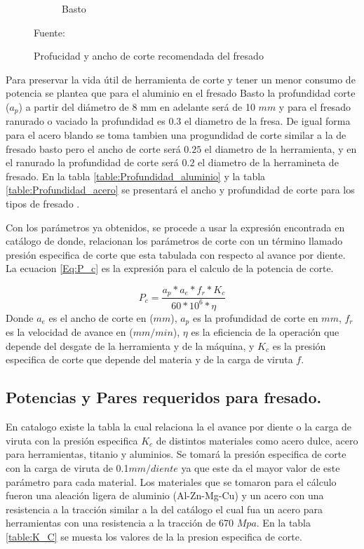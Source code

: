 \begin{figure}[hbt]
\begin{subfigure}{0.3\textwidth}
        \caption{Basto}
        \label{fig:Basto}
    \end{subfigure} 
    \caption{Profucidad y ancho de corte recomendada del fresado}{Fuente: \citep{catalogue:Blue_Master}}
    \label{fig:Profun}
\end{figure}

Para preservar la vida útil de herramienta de corte y tener un menor consumo de potencia se plantea que para el aluminio en el fresado Basto la profundidad corte ($a_p$) a partir del diámetro de 8 mm en adelante será de 10 $mm$ y para el fresado ranurado o vaciado la profundidad es $0.3$ el diametro de la fresa. De igual forma para el acero blando se toma tambien una progundidad de corte similar a la de fresado basto pero el ancho de corte será $0.25$ el diametro de la herramienta, y en el ranurado la profundidad de corte será $0.2$ el diametro de la herramineta de fresado. En la tabla \ref{table:Profundidad_aluminio} y la tabla \ref{table:Profundidad_acero} se presentará el ancho y profundidad de corte para los tipos de fresado .

Con los parámetros ya obtenidos, se procede a usar la expresión encontrada en catálogo de \cite{catalogue:CatalogoC006s} donde,  relacionan los parámetros de corte con un término llamado presión especifica de corte que esta tabulada con respecto al avance por diente. La ecuacion \ref{Eq:P_c} es la expresión para el calculo de la potencia de corte.



\begin{equation}
    P_{c}=\frac{a_{p}*a_{e}*f_{r}*K_{c}}{60*10^6*\eta}
    \label{Eq:P_c}
\end{equation}
Donde $a_{e}$ es el ancho de corte en ($mm$), $a_{p}$ es la profundidad de corte en $mm$, $f_{r}$ es la velocidad de avance en ($mm/min$), $\eta $ es la eficiencia de la operación que depende del desgate de la herramienta y de la máquina, y $K_{c}$ es  la presión especifica  de corte que depende del materia y de la carga de viruta $f$.

\newpage
\subsection{Potencias y Pares requeridos para fresado.}

En catalogo \cite{catalogue:CatalogoC006s} existe la tabla la cual relaciona la el avance por diente o la carga de viruta con la presión especifica $K_{c}$ de distintos materiales como acero dulce, acero para herramientas, titanio y aluminios. Se tomará la presión especifica de corte con la carga de viruta de 0.1$mm/diente$ ya que este da el mayor valor de este parámetro para cada material. Los materiales que se tomaron para el cálculo fueron una aleación ligera de aluminio (Al-Zn-Mg-Cu) y un acero con una resistencia a la tracción similar a la del catálogo \cite{catalogue:Blue_Master} el cual fua un acero para herramientas con una resistencia a la tracción de 670 $Mpa$. En la tabla \ref{table:K_C} se muesta los valores de la la presion especifica de corte.


